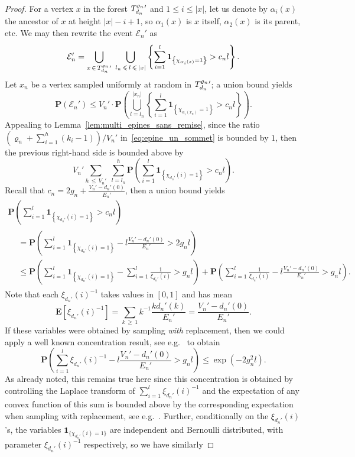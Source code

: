 \documentclass[10pt]{amsart}
\theoremstyle{definition}\newtheorem{defi}[theo]{Definition}\newtheorem{rema}[theo]{Remark}\newtheorem{exam}[theo]{Example}\newtheorem{exem}[theo]{Example}\newtheorem{nota}[theo]{Notation}
\newcommand{\ensembles}[1]{\mathbf{#1}}
\renewcommand{\P}{\ensembles{P}}
\newcommand{\E}{\ensembles{E}}
\renewcommand{\Pr}[1]{\P\left(#1\right)}
\newcommand{\Es}[1]{\E\left[#1\right]}
\newcommand{\1}{\ensembles{1}}
\newcommand{\ind}[1]{\1_{\{#1\}}}
\renewcommand{\le}{\leqslant}
\renewcommand{\ge}{\geqslant}
\newcommand{\clE}{\mathcal{E}}
\newcommand{\fn}{T_{d_n}^{\varrho_n}}
\newcommand{\edges}{E}
\newcommand{\vertices}{V}
\providecommand{\?}{}
\begin{document}
\begin{proof}
For a vertex $x$ in the forest ${\fn}\vphantom{T}'$ and $1 \le i \le |x|$, let us denote by $\alpha_i(x)$ the ancestor of $x$ at height $|x|-i+1$, so $\alpha_1(x)$ is $x$ itself, $\alpha_2(x)$ is its parent, etc. We may then rewrite the event $\clE_{n}'$ as
\[
\clE_n' = \bigcup_{x\,\in\,{\fn}\vphantom{T}'}\; \bigcup_{l_n\,\le\,l\,\le\,|x|} \left\{\sum_{i=1}^l \1_{\left\{\chi_{\alpha_i(x)} = 1\right\}} > c_n l\right\}.
\]
Let $x_n$ be a vertex sampled uniformly at random in ${\fn}\vphantom{T}'$; a union bound yields
\[
\Pr{\clE_n'}
\le \vertices_n' \cdot \Pr{\bigcup_{l = l_n}^{|x_n|} \left\{\sum_{i=1}^l \1_{\left\{\chi_{\alpha_i(x_n)} = 1\right\}} > c_n l\right\}}.
\]
Appealing to Lemma~\ref{lem:multi_epines_sans_remise}, since the ratio $(\varrho_n + \sum_{i=1}^h (k_i - 1))/\vertices_n'$ in~\eqref{eq:epine_un_sommet} is bounded by $1$, then the previous right-hand side is bounded above by
\[
\vertices_n' \sum_{h\,\le\,\vertices_n'}\; \sum_{l = l_n}^h \Pr{\sum_{i=1}^l \1_{\left\{\chi_{d_n'}(i) = 1\right\}} > c_n l}.
\]
Recall that $c_n = 2g_n + \frac{\vertices_n'-d_{n}'(0)}{\edges_n'}$, then a union bound yields
\begin{multline*}
\Pr{\sum_{i=1}^l \1_{\left\{\chi_{d_n'}(i) = 1\right\}} > c_n l}
\\
\begin{aligned}
&= \Pr{\sum_{i=1}^l \1_{\left\{\chi_{d_n'}(i) = 1\right\}} - l \frac{\vertices_n'-d_{n}'(0)}{\edges_n'} > 2g_n l}
\\
&\le \Pr{\sum_{i=1}^l \1_{\left\{\chi_{d_n'}(i) = 1\right\}} - \sum_{i=1}^l \frac{1}{\xi_{d_n'}(i)} > g_nl} + \Pr{\sum_{i=1}^l \frac{1}{\xi_{d_n'}(i)} - l \frac{\vertices_n'-d_{n}'(0)}{\edges_n'} > g_nl}.
\end{aligned}
\end{multline*}
Note that each $\xi_{d_n'}(i)^{-1}$ takes values in $[0,1]$ and has mean
\[
\Es{\xi_{d_n'}(i)^{-1}} = \sum_{k\,\ge\,1} k^{-1} \frac{k d_n'(k)}{\edges_{n}'} = \frac{\vertices_{n}'-d_{n}'(0)}{\edges_{n}'}.
\]
If these variables were obtained by sampling \emph{with} replacement, then we could apply a well known concentration result, see e.g.~\cite[Theorem~2.3]{McD98} to obtain
\[
\Pr{\sum_{i=1}^l \xi_{d_n'}(i)^{-1} - l \frac{\vertices_{n}'-d_{n}'(0)}{\edges_{n}'} > g_nl}
\le \exp\left(- 2 g_n^2 l\right).
\]
As already noted, this remains true here since this concentration is obtained by controlling the Laplace transform of $\sum_{i=1}^l \xi_{d_n'}(i)^{-1}$ and the expectation of any convex function of this sum is bounded above by the corresponding expectation when sampling with replacement, see e.g.~\cite[Proposition~20.6]{Ald85}. Further, conditionally on the $\xi_{d_n'}(i)$'s, the variables $\ind{\chi_{d_n'}(i) = 1}$ are independent and Bernoulli distributed, with parameter $\xi_{d_n'}(i)^{-1}$ respectively, so we have similarly

\end{proof}
\end{document}
